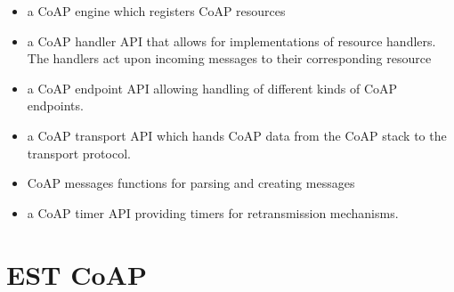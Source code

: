 \documentclass[0-thesis.tex]{subfiles}
\begin{document}
\begin{itemize}
    \item a CoAP engine which registers CoAP resources
    \item a CoAP handler API that allows for implementations of resource handlers. The
        handlers act upon incoming messages to their corresponding resource
    \item a CoAP endpoint API allowing handling of different kinds of CoAP endpoints.
    \item a CoAP transport API which hands CoAP data from the CoAP stack to the transport
    protocol.
    \item CoAP messages functions for parsing and creating messages
    \item a CoAP timer API providing timers for retransmission mechanisms.    
\end{itemize}


\section{EST CoAP}
\label{ssec:pki}
\end{document}
